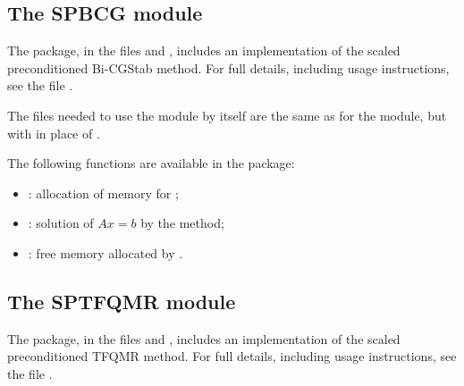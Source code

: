 \subsection{The SPBCG module}\label{ss:spbcg}

The {\spbcg} package, in the files  and
, includes an implementation of the scaled
preconditioned Bi-CGStab method.
For full details, including usage instructions, see the file .

The files needed to use the {\spbcg} module by itself are the same as for the
{\spgmr} module, but with  in place of
.

The following functions are available in the {\spbcg} package:  
\begin{itemize}
\item {}: allocation of memory for ;
\item {}: solution of $Ax = b$ by the {\spbcg} method;
\item {}: free memory allocated by .
\end{itemize}



\subsection{The SPTFQMR module}\label{ss:sptfqmr}

The {\sptfqmr} package, in the files  and
, includes an implementation of the scaled
preconditioned TFQMR method.  For full details,
including usage instructions, see the file .

